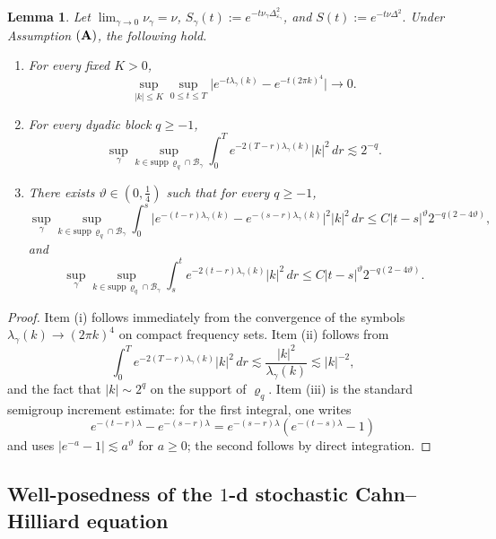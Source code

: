 \documentclass{article}
\newtheorem{lemma}{Lemma}
\begin{document}
\begin{lemma}\label{ass:semigroup}
Let $\lim_{\gamma \to 0}\nu_{\gamma} = \nu$, 
\(
S_\gamma(t):=e^{-t\nu_{\gamma}\Delta_{\varepsilon_\gamma}^2}\), and \(S(t):=e^{-t\nu\Delta^2}.\)
Under Assumption \( ({\bf A}) \), the following hold.

\begin{enumerate}
\item[(i)] For every fixed \(K>0\),
\[
\sup_{|k|\le K}\sup_{0\le t\le T}
\bigl|e^{-t\lambda_\gamma(k)}-e^{-t(2\pi k)^4}\bigr|
\longrightarrow0.
\]

\item[(ii)] For every dyadic block \(q\ge -1\),
\[
\sup_{\gamma}\sup_{k\in \mathrm{supp}\,\varrho_q\cap\mathcal B_\gamma}
\int_0^T e^{-2(T-r)\lambda_\gamma(k)}|k|^2\,dr
\lesssim 2^{-q}.
\]

\item[(iii)] There exists \(\vartheta\in(0,\frac14)\) such that for every \(q\ge -1\),
\[
\sup_{\gamma}
\sup_{k\in\mathrm{supp}\,\varrho_q\cap\mathcal B_\gamma}
\int_0^s
\bigl|e^{-(t-r)\lambda_\gamma(k)}-e^{-(s-r)\lambda_\gamma(k)}\bigr|^2|k|^2\,dr
\le
C|t-s|^\vartheta 2^{-q(2-4\vartheta)},
\]
and
\[
\sup_{\gamma}
\sup_{k\in\mathrm{supp}\,\varrho_q\cap\mathcal B_\gamma}
\int_s^t
e^{-2(t-r)\lambda_\gamma(k)}|k|^2\,dr
\le
C|t-s|^\vartheta 2^{-q(2-4\vartheta)}.
\]
\end{enumerate}
\end{lemma}

\begin{proof}
Item (i) follows immediately from the convergence of the symbols \(\lambda_\gamma(k)\to (2\pi k)^4\) on compact frequency sets. Item (ii) follows from
\[
\int_0^T e^{-2(T-r)\lambda_\gamma(k)}|k|^2\,dr
\lesssim \frac{|k|^2}{\lambda_\gamma(k)}
\lesssim |k|^{-2},
\]
and the fact that \(|k|\sim 2^q\) on the support of \(\varrho_q\).
Item (iii) is the standard semigroup increment estimate:
for the first integral, one writes
\[
e^{-(t-r)\lambda}-e^{-(s-r)\lambda}
=
e^{-(s-r)\lambda}(e^{-(t-s)\lambda}-1)
\]
and uses \(|e^{-a}-1|\lesssim a^\vartheta\) for \(a\ge0\); the second follows by direct integration.
\end{proof}




\subsection{Well-posedness of the $1$-d stochastic Cahn--Hilliard equation}\label{subsec:1d-sch-background}
\end{document}

